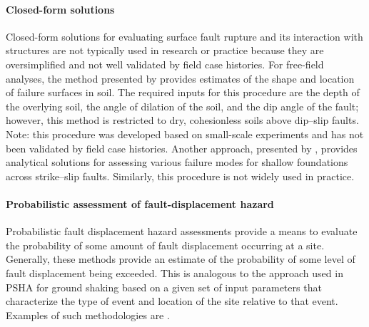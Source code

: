 \paragraph{Closed-form solutions}
Closed-form solutions for evaluating surface fault rupture and its interaction with structures are not typically used in research or practice because they are oversimplified and not well validated by field case histories. For free-field analyses, the method presented by \citet{cole1984influence} provides estimates of the shape and location of failure surfaces in soil. The required inputs for this procedure are the depth of the overlying soil, the angle of dilation of the soil, and the dip angle of the fault; however, this method is restricted to dry, cohesionless soils above dip--slip faults.  Note: this procedure was developed based on small-scale experiments and has not been validated by field case histories. Another approach, presented by \citet{berrill1983twodimensional}, provides analytical solutions for assessing various failure modes for shallow foundations across strike--slip faults. Similarly, this procedure is not widely used in practice.

\paragraph{Probabilistic assessment of fault-displacement hazard}
Probabilistic fault displacement hazard assessments provide a means to evaluate the probability of some amount of fault displacement occurring at a site. Generally, these methods provide an estimate of the probability of some level of fault displacement being exceeded. This is analogous to the approach used in PSHA for ground shaking based on a given set of input parameters that characterize the type of event and location of the site relative to that event. Examples of such methodologies are \citet{youngs2003methodology, petersen2011fault, moss2011probabilistic, hecker2013variability}.

